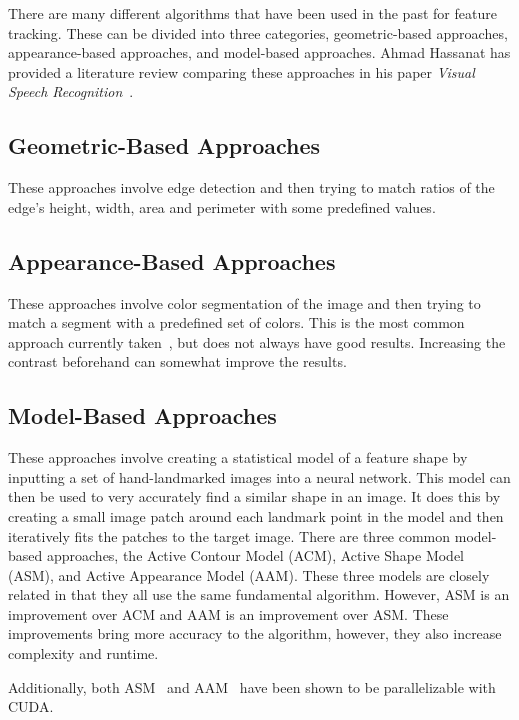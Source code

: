 There are many different algorithms that have been used in the past for feature tracking. 
These can be divided into three categories, geometric-based approaches, appearance-based approaches, and model-based approaches. Ahmad Hassanat has provided a literature review comparing these approaches in his paper \textit{Visual Speech Recognition}~\cite{Hassanat14}.

\subsection{Geometric-Based Approaches}

These approaches involve edge detection and then trying to match ratios of the edge's height, width, area and perimeter with some predefined values.

\subsection{Appearance-Based Approaches}

These approaches involve color segmentation of the image and then trying to match a segment with a predefined set of colors. 
This is the most common approach currently taken~\cite{Stillittano13}\cite{Yang09}, but does not always have good results. Increasing the contrast beforehand can somewhat improve the results.

\subsection{Model-Based Approaches}

These approaches involve creating a statistical model of a feature shape by inputting a set of hand-landmarked images into a neural network.
This model can then be used to very accurately find a similar shape in an image. It does this by creating a small image patch around each landmark point in the model and then iteratively fits the patches to the target image.
There are three common model-based approaches, the Active Contour Model (ACM), Active Shape Model (ASM), and Active Appearance Model (AAM).
These three models are closely related in that they all use the same fundamental algorithm. However, ASM is an improvement over ACM and AAM is an improvement over ASM. These improvements bring more accuracy to the algorithm, however, they also increase complexity and runtime.

Additionally, both ASM~\cite{Li09} and AAM~\cite{Wang14} have been shown to be parallelizable with CUDA.


